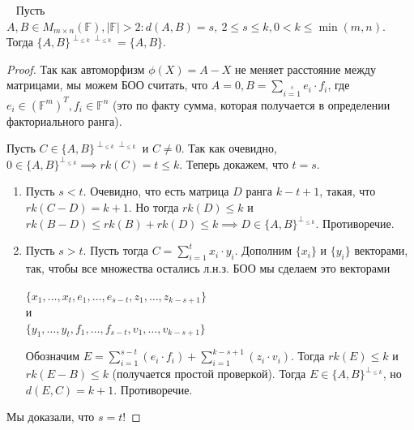 \documentclass{article}
\begin{document}
\begin{theorem}~\cite[лемма 2.2]{art2}
    Пусть $A, B \in M_{m \times n}(\mathbb{F}), |\mathbb{F}| > 2: d(A, B) = s, \ 2 \le s \le k, 0 < k \le \min(m, n).$ Тогда $\{A, B\}^{\perp_{\le k} \perp_{\le k}} = \{A, B\}$.
\end{theorem}
\begin{proof}
    Так как автоморфизм $\phi(X) = A - X$ не меняет расстояние между матрицами, мы можем БОО считать, что $A = 0, B = \sum\limits_{i = 1}\limits^{s} e_i \cdot f_i$, где $e_i \in (\mathbb{F}^m)^T, f_i \in \mathbb{F}^n$ (это по факту сумма, которая получается в определении факториального ранга).
    
    Пусть $C \in \{A, B\}^{\perp_{\le k} \perp_{\le k}}$ и $C\ne 0$. Так как очевидно, $0 \in \{A, B\}^{\perp_{\le k}} \implies rk(C) = t \le k$. Теперь докажем, что $t = s$.
    \begin{enumerate}
        \item Пусть $s < t$. Очевидно, что есть матрица $D$ ранга $k-t + 1$, такая, что $rk(C - D) = k + 1$. Но тогда $rk(D) \le k$ и $rk(B - D) \le rk(B) + rk(D) \le k \implies D \in \{A, B\}^{\perp_{\le k}}$. Противоречие.
        
        \item Пусть $s > t$. Пусть тогда $C = \sum\limits_{i = 1}^{t} {x_i \cdot y_i}$. Дополним $\{x_i\}$ и $\{y_i\}$ векторами, так, чтобы все множества остались л.н.з. БОО мы сделаем это векторами
        \begin{center}
            $\{x_1, \dots, x_t, e_1, \dots, e_{s -t}, z_1, \dots, z_{k - s + 1}\}$ \\
            и \\
            $\{y_1, \dots, y_t, f_1, \dots, f_{s -t}, v_1, \dots, v_{k - s + 1}\}$
        \end{center}
        Обозначим $E = \sum\limits_{i = 1}^{s - t}{(e_i \cdot f_i)} + \sum\limits_{i = 1}^{k - s + 1}{(z_i \cdot v_i)}$. Тогда $rk(E) \le k$ и $rk(E - B) \le k$ (получается простой проверкой). Тогда $E \in \{A, B\}^{\perp_{\le k}}$, но $d(E, C) = k + 1.$ Противоречие.
    \end{enumerate}
    Мы доказали, что $s = t$!
    

\end{proof}
\end{document}
